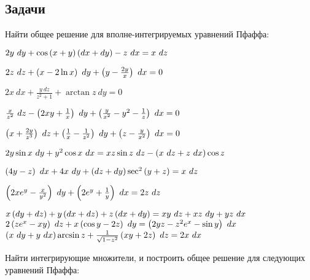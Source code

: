 \subsection{Задачи}

	Найти общее решение для вполне-интегрируемых уравнений Пфаффа:

	\begin{enumtasks}

		\label{nonlinsys_pfaff:general}
		\item \( 2 y ~ dy + \cos{(x + y)} \left( dx + dy \right) - z ~ dx = x ~ dz \) 	 												%
		\item \( 2 z ~dz + \left( x - 2 \ln{x} \right) ~dy + \left( y - \frac{2 y}{x} \right) ~dx = 0 \) 	 									%
		\item \( 2 x ~dx + \frac{y ~dz}{z^{2} + 1} + \arctan{z} ~dy = 0 \)														%
		\item \( \frac{x}{z^2} ~ dz - \left( 2xy + \frac{1}{x} \right) ~ dy + \left( \frac{y}{x^2} - y^2 - \frac{1}{z} \right) ~dx = 0 \) 	 		%
		\item \( \left( x + \frac{2 y}{z^3} \right) ~dz + \left( \frac{1}{x} - \frac{1}{z^2} \right) ~dy + \left( z - \frac{y}{x^2} \right) ~dx = 0 \)	%
		\item \( 2y\sin{x} ~ dy + y^2 \cos{x} ~ dx = xz \sin{z} ~ dz - \left( x ~ dz + z ~ dx \right) \cos{z} \) 						%
		\item \( \left( 4y - z \right) ~dx + 4x ~ dy + \left( dz + dy \right) \sec^2\left( y+z \right) = x ~ dz \) 	 								%
		\item \( \left( 2 xe^{y} - \frac{x}{y^2} \right) ~dy + \left( 2 e^{y} + \frac{1}{y} \right) ~dx = 2z ~ dz \) 	 						%
		\item \( x \left( dy + dz \right) + y \left( dx + dz \right) + z \left( dx + dy \right) = xy ~ dz + xz ~ dy + yz ~ dx \) 	 					%
		\itemstar \( 2 \left( z e^x - xy \right) ~ dz + x \left( \cos{y} - 2z \right) ~ dy = \left( 2yz - z^2 e^x - \sin{y} \right) ~ dx \)				%
		\itemstar \( \left( x ~ dy + y ~ dx \right) \arcsin{z} + \frac{1}{\sqrt{1 - z^2}} \left( xy + 2z \right) ~ dz = 2x ~ dx \)					%

	\end{enumtasks}

	Найти интегрирующие множители, и построить общее решение для следующих уравнений Пфаффа:

